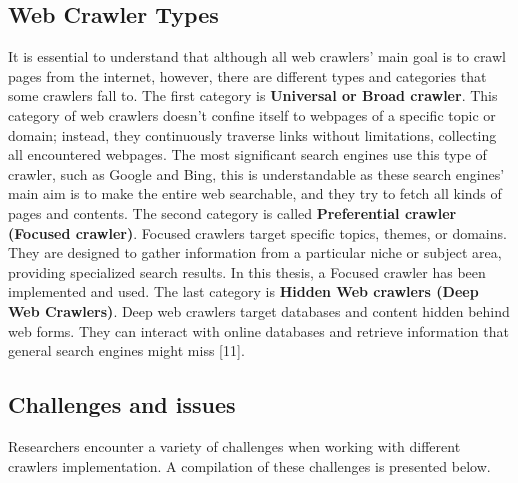 \subsection{Web Crawler Types}
It is essential to understand that although all web crawlers' main goal is to crawl pages from the internet, however, there are different types and categories that some crawlers fall to. The first category is  \textbf{Universal or Broad crawler}. This category of web crawlers doesn't confine itself to webpages of a specific topic or domain; instead, they continuously traverse links without limitations, collecting all encountered webpages. The most significant search engines use this type of crawler, such as Google and Bing, this is understandable as these search engines' main aim is to make the entire web searchable, and they try to fetch all kinds of pages and contents. The second category is called \textbf{Preferential crawler (Focused crawler)}. Focused crawlers target specific topics, themes, or domains. They are designed to gather information from a particular niche or subject area, providing specialized search results. In this thesis, a Focused crawler has been implemented and used. The last category is \textbf{Hidden Web crawlers (Deep Web Crawlers)}. Deep web crawlers target databases and content hidden behind web forms. They can interact with online databases and retrieve information that general search engines might miss [11].

\subsection{Challenges and issues}
Researchers encounter a variety of challenges when working with different crawlers implementation. A compilation of these challenges is presented below.


